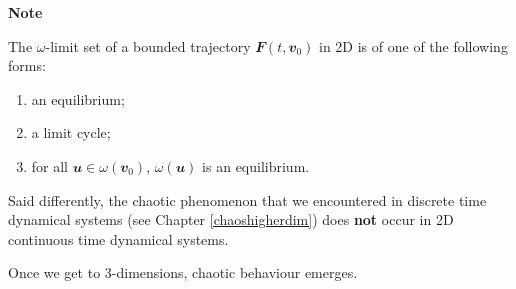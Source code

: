 \documentclass[
  a4paper,
  oneside,
  final]{krantz}
\providecommand{\tightlist}{%
  \setlength{\itemsep}{0pt}\setlength{\parskip}{0pt}}
\renewcommand{\v}[1]{{\mathbfit{#1}}}
\theoremstyle{definition}
\theoremstyle{definition}
\theoremstyle{definition}
\theoremstyle{definition}
\theoremstyle{remark}
\begin{document}
\begin{palegreenbox}

\begin{center}
\textbf{Note}

\end{center}

The \(\omega\)-limit set of a bounded trajectory \(\v{F}(t, \v{v}_0)\) in 2D is of one of the following forms:

\begin{enumerate}
\def\labelenumi{\roman{enumi}.}
\tightlist
\item
  an equilibrium;
\item
  a limit cycle;
\item
  for all \(\v{u} \in \omega(\v{v}_{0})\), \(\omega(\v{u})\) is an equilibrium.
\end{enumerate}

Said differently, the chaotic phenomenon that we encountered in discrete time dynamical systems (see Chapter \ref{chaoshigherdim}) does \textbf{not} occur in 2D continuous time dynamical systems.

\end{palegreenbox}

Once we get to \(3\)-dimensions, chaotic behaviour emerges.
\end{document}
